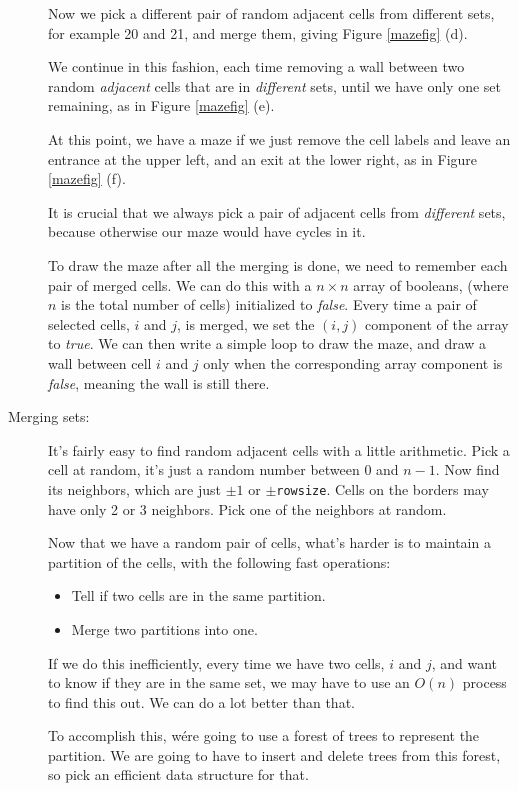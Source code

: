 \documentclass{article}
\begin{document}
\begin{description}
  Now we pick a different pair of random adjacent cells from different
  sets, for example 20 and 21, and merge them, giving Figure
  \ref{mazefig} (d).


  We continue in this fashion, each time removing a wall between two
  random {\em adjacent} cells that are in {\em different} sets, until
  we have only one set remaining, as in Figure \ref{mazefig} (e).  


At this point, we have a maze if we just remove the cell labels
and leave an entrance at the upper left, and an
exit at the lower right, as in Figure \ref{mazefig} (f).
  
It is crucial that we always pick a pair of adjacent cells from {\em
  different} sets, because otherwise our maze would have cycles in it.

To draw the maze after all the merging is done, we need to remember
each pair of merged cells.  We can do this with a $n\times n$ array of
booleans, (where $n$ is the total number of cells) initialized to {\em
  false}.  Every time a pair of selected cells, $i$ and $j$, is
merged, we set the $(i,j)$ component of the array to {\em true}.  We
can then write a simple loop to draw the maze, and draw a wall between
cell $i$ and $j$ only when the corresponding array component is {\em
  false}, meaning the wall is still there.



\item[Merging sets:] It's fairly easy to find random adjacent cells
  with a little arithmetic.  Pick a cell at random, it's just a
  random number between 0 and $n-1$.  Now find its neighbors, which
  are just $\pm 1$ or $\pm${\tt rowsize}.  Cells on the borders may
  have only 2 or 3 neighbors.  Pick one of the neighbors at random.

Now that we have a random pair of cells, what's harder is to maintain
a partition of the cells, with the following fast operations:
  \begin{itemize}
  \item Tell if two cells are in the same partition.
    \item Merge two partitions into one.
  \end{itemize}

If we do this inefficiently, every time we have two cells, $i$ and
$j$, and want to know if they are in the same set, we may have to use
an $O(n)$ process to find this out.  We can do a lot better than that.

  To accomplish this, wére going to use a forest of trees to represent
  the partition.  We are going to have to insert and delete trees from
  this forest, so pick an efficient data structure for that.


\end{description}
\end{document}
